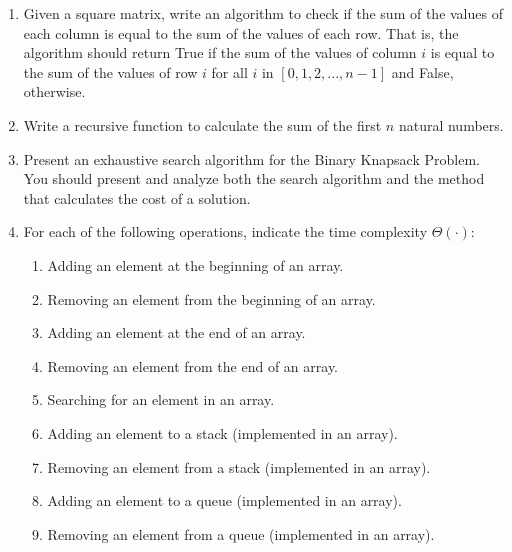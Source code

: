 \documentclass[12pt]{article}
\begin{document}
\begin{enumerate}
    \item Given a square matrix, write an algorithm to check if the sum of the values of each column is equal to the sum of the values of each row. That is, the algorithm should return True if the sum of the values of column $i$ is equal to the sum of the values of row $i$ for all $i$ in $[0, 1, 2, ..., n-1]$ and False, otherwise. 
    
%
%
%
%
%


    \item Write a recursive function to calculate the sum of the first \( n \) natural numbers.
    
    \item Present an exhaustive search algorithm for the Binary Knapsack Problem. You should present and analyze both the search algorithm and the method that calculates the cost of a solution.
    
    \item For each of the following operations, indicate the time complexity $\Theta(\cdot)$:
    \begin{enumerate}
        \item Adding an element at the beginning of an array.
        \item Removing an element from the beginning of an array.
        \item Adding an element at the end of an array.
        \item Removing an element from the end of an array.
        \item Searching for an element in an array.
        \item Adding an element to a stack (implemented in an array).
        \item Removing an element from a stack (implemented in an array).
        \item Adding an element to a queue (implemented in an array).
        \item Removing an element from a queue (implemented in an array).
    \end{enumerate}

\end{enumerate}
\end{document}
